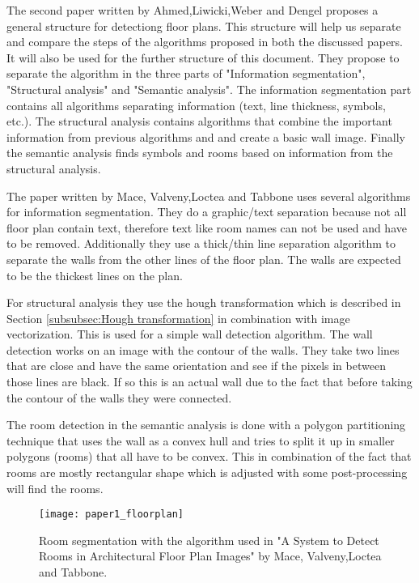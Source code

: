 The second paper written by Ahmed,Liwicki,Weber and Dengel proposes a general structure for detectiong floor plans. This structure will help us separate and compare the steps of the algorithms proposed in both the discussed papers. It will also be used for the further structure of this document. They propose to separate the algorithm in the three parts of "Information segmentation", "Structural analysis" and "Semantic analysis". The information segmentation part contains all algorithms separating information (text, line thickness, symbols, etc.). The structural analysis contains algorithms that combine the important information from previous algorithms and and create a basic wall image. Finally the semantic analysis finds symbols and rooms based on information from the structural analysis.

The paper written by Mace, Valveny,Loctea and Tabbone uses several algorithms for information segmentation. They do a graphic/text separation because not all floor plan contain text, therefore text like room names can not be used and have to be removed.  Additionally they use a thick/thin line separation algorithm to separate the walls from the other lines of the floor plan. The walls are expected to be the thickest lines on the plan.

For structural analysis they use the hough transformation which is described in Section \ref{subsubsec:Hough transformation} in combination with image vectorization. This is used for a simple wall detection algorithm. The wall detection works on an image with the contour of the walls. They take two lines that are close and have the same orientation and see if the pixels in between those lines are black. If so this is an actual wall due to the fact that before taking the contour of the walls they were connected. 

The room detection in the semantic analysis is done with a polygon partitioning technique that uses the wall as a convex hull and tries to split it up in smaller polygons (rooms) that all have to be convex. This in combination of the fact that rooms are mostly rectangular shape which is adjusted with some post-processing will find the rooms.

\begin{figure}[h]
	\centering
	\texttt{[image: paper1\_floorplan]}
	\caption{Room segmentation with the algorithm used in "A System to Detect Rooms in Architectural Floor Plan Images" by Mace, Valveny,Loctea and Tabbone. }
	\label{fig:paper1_floorplan}
\end{figure}

